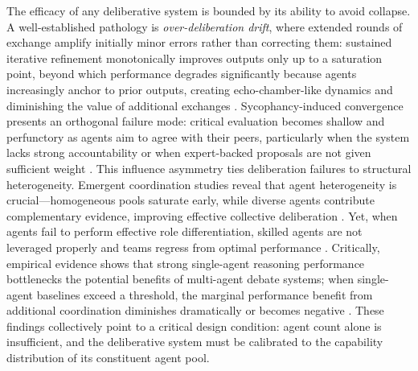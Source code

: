 \documentclass[11pt,a4paper]{article}
\begin{document}
The efficacy of any deliberative system is bounded by its ability to avoid collapse. A well-established pathology is \emph{over-deliberation drift}, where extended rounds of exchange amplify initially minor errors rather than correcting them: sustained iterative refinement monotonically improves outputs only up to a saturation point, beyond which performance degrades significantly because agents increasingly anchor to prior outputs, creating echo-chamber-like dynamics and diminishing the value of additional exchanges \cite{arxiv:2503.03800v1}. Sycophancy-induced convergence presents an orthogonal failure mode: critical evaluation becomes shallow and perfunctory as agents aim to agree with their peers, particularly when the system lacks strong accountability or when expert-backed proposals are not given sufficient weight \cite{arxiv:2602.01011v4}. This influence asymmetry ties deliberation failures to structural heterogeneity. Emergent coordination studies reveal that agent heterogeneity is crucial---homogeneous pools saturate early, while diverse agents contribute complementary evidence, improving effective collective deliberation \cite{arxiv:2602.03794v1}. Yet, when agents fail to perform effective role differentiation, skilled agents are not leveraged properly and teams regress from optimal performance \cite{arxiv:2602.01011v4}. Critically, empirical evidence shows that strong single-agent reasoning performance bottlenecks the potential benefits of multi-agent debate systems; when single-agent baselines exceed a threshold, the marginal performance benefit from additional coordination diminishes dramatically or becomes negative \cite{arxiv:2604.02460v2,arxiv:2512.08296v3}. These findings collectively point to a critical design condition: agent count alone is insufficient, and the deliberative system must be calibrated to the capability distribution of its constituent agent pool.
\end{document}
